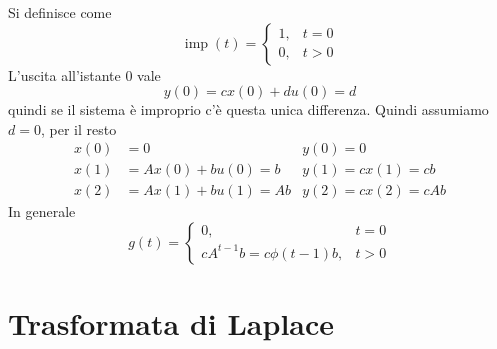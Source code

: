 \documentclass[10pt,a4paper]{book}
\DeclareMathOperator{\imp}{imp}
\begin{document}
Si definisce come
\begin{equation*}
	\imp(t) =\begin{cases}
	1, & t=0\\
	0, & t >0
	\end{cases}
\end{equation*}
L'uscita all'istante $0$ vale
\begin{equation*}
	y(0) =cx(0) +du(0) =d
\end{equation*}
quindi se il sistema è improprio c'è questa unica differenza. Quindi assumiamo $d=0$, per il resto
\begin{equation*}
	\begin{aligned}
		x(0) & =0                & y(0) =0          \\
		x(1) & =Ax(0) +bu(0) =b  & y(1) =cx(1) =cb  \\
		x(2) & =Ax(1) +bu(1) =Ab & y(2) =cx(2) =cAb 
	\end{aligned}
\end{equation*}
In generale
\begin{equation*}
	\boxed{g(t) =\begin{cases}
		0, & t=0\\
		cA^{t-1} b=c\phi (t-1) b, & t >0
		\end{cases}
	}
\end{equation*}
\section{Trasformata di Laplace}
\end{document}
